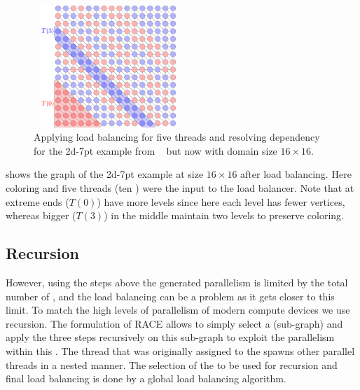   \setlength{\belowcaptionskip}{-10pt}
  \begin{figure}[t]
  	\begin{minipage}[c]{0.26\textwidth}
  	\includegraphics[height=12.4em,width=15.2em]{pics/race_method/load_balancing}
  	\end{minipage}\hspace{2.2em}
  	 \begin{minipage}[c]{0.16\textwidth}
  	\caption{\label{fig:lb} Applying load balancing for five threads and resolving \DTWO
  		dependency for the 2d-7pt example from ~ but now with domain size $16\times16$.  }
  	\end{minipage}
  \end{figure}
   \setlength{\belowcaptionskip}{0pt}
   
   shows the graph of the 2d-7pt example at size $16\times16$ after
   load balancing. Here \DTWO coloring and five threads
    (\ie ten \levelGroups) were the input to the load balancer.
    Note that \levelGroups at extreme ends (\eg $T(0)$) have more levels
    since here each level has fewer vertices, whereas bigger \levelGroups
    (\eg $T(3)$) in the middle maintain two levels to preserve \DK coloring.
    
\subsection{Recursion}
However, using the steps above the generated parallelism is limited by the total number
of \levels, and the load balancing can be a problem as it gets closer to this limit.
To match the high levels of parallelism of modern compute devices  we use recursion. The formulation of \acrshort{RACE} allows to simply select a \levelGroup (sub-graph) and apply the three
 steps recursively on this sub-graph to exploit the parallelism 
 within this \levelGroup. The thread that was originally assigned to the
 \levelGroup spawns other parallel threads in a nested manner. 
 The selection of the \levelGroup to be used for recursion and final load balancing 
 is done by  a global load balancing algorithm.
 
